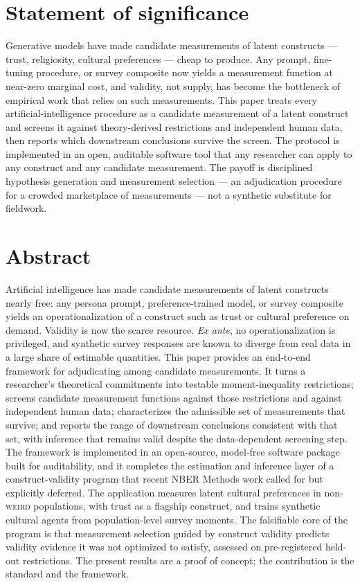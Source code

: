\documentclass[10pt,letterpaper]{article}
\newcommand{\WEIRD}{\textsc{weird}}
\begin{document}
\section*{Statement of significance}
Generative models have made candidate measurements of latent constructs --- trust, religiosity, cultural preferences --- cheap to produce. Any prompt, fine-tuning procedure, or survey composite now yields a measurement function at near-zero marginal cost, and validity, not supply, has become the bottleneck of empirical work that relies on such measurements. This paper treats every artificial-intelligence procedure as a candidate measurement of a latent construct and screens it against theory-derived restrictions and independent human data, then reports which downstream conclusions survive the screen. The protocol is implemented in an open, auditable software tool that any researcher can apply to any construct and any candidate measurement. The payoff is disciplined hypothesis generation and measurement selection --- an adjudication procedure for a crowded marketplace of measurements --- not a synthetic substitute for fieldwork.

\section*{Abstract}
Artificial intelligence has made candidate measurements of latent constructs nearly free: any persona prompt, preference-trained model, or survey composite yields an operationalization of a construct such as trust or cultural preference on demand. Validity is now the scarce resource. \emph{Ex ante}, no operationalization is privileged, and synthetic survey responses are known to diverge from real data in a large share of estimable quantities. This paper provides an end-to-end framework for adjudicating among candidate measurements. It turns a researcher's theoretical commitments into testable moment-inequality restrictions; screens candidate measurement functions against those restrictions and against independent human data; characterizes the admissible set of measurements that survive; and reports the range of downstream conclusions consistent with that set, with inference that remains valid despite the data-dependent screening step. The framework is implemented in an open-source, model-free software package built for auditability, and it completes the estimation and inference layer of a construct-validity program that recent NBER Methods work called for but explicitly deferred. The application measures latent cultural preferences in non-\WEIRD{} populations, with trust as a flagship construct, and trains synthetic cultural agents from population-level survey moments. The falsifiable core of the program is that measurement selection guided by construct validity predicts validity evidence it was not optimized to satisfy, assessed on pre-registered held-out restrictions. The present results are a proof of concept; the contribution is the standard and the framework.
\end{document}
